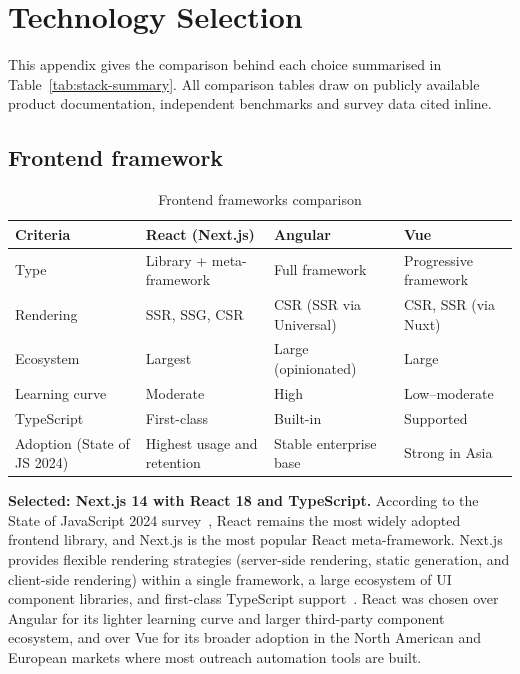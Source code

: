 \documentclass[a4paper]{article}
\begin{document}
\newpage
\section{Technology Selection}
\label{appendix:tech-selection}

This appendix gives the comparison behind each choice summarised in
Table~\ref{tab:stack-summary}. All comparison tables draw on publicly
available product documentation, independent benchmarks and survey data
cited inline.

\subsection{Frontend framework}
\begin{table}[H]
\centering
\caption{Frontend frameworks comparison}
\label{tab:frontend-comparison}
\begin{tabular}{l p{3.5cm} p{3.5cm} p{3.5cm}}
\hline
\textbf{Criteria} & \textbf{React (Next.js)} & \textbf{Angular} & \textbf{Vue} \\
\hline
Type & Library + meta-framework & Full framework & Progressive framework \\
Rendering & SSR, SSG, CSR & CSR (SSR via Universal) & CSR, SSR (via Nuxt) \\
Ecosystem & Largest & Large (opinionated) & Large \\
Learning curve & Moderate & High & Low--moderate \\
TypeScript & First-class & Built-in & Supported \\
Adoption (State of JS 2024) & Highest usage and retention & Stable enterprise base & Strong in Asia \\
\hline
\end{tabular}
\end{table}

\textbf{Selected: Next.js 14 with React 18 and TypeScript.}
According to the State of JavaScript 2024
survey~\cite{stateofjs2024}, React remains the most widely adopted
frontend library, and Next.js is the most popular React
meta-framework. Next.js provides flexible rendering strategies
(server-side rendering, static generation, and client-side
rendering) within a single framework, a large ecosystem of UI
component libraries, and first-class TypeScript
support~\cite{nextjs_docs}. React was chosen over Angular for its
lighter learning curve and larger third-party component ecosystem,
and over Vue for its broader adoption in the North American and
European markets where most outreach automation tools are built.
\end{document}

